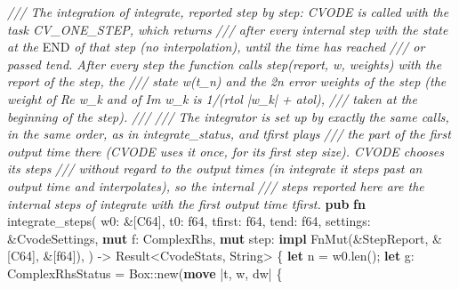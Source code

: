 \documentclass[
  10pt,
]{article}
\newenvironment{Shaded}{}{}
\newcommand{\BuiltInTok}[1]{\textcolor[rgb]{0.00,0.50,0.00}{#1}}
\newcommand{\CommentTok}[1]{\textcolor[rgb]{0.38,0.63,0.69}{\textit{#1}}}
\newcommand{\DataTypeTok}[1]{\textcolor[rgb]{0.56,0.13,0.00}{#1}}
\newcommand{\KeywordTok}[1]{\textcolor[rgb]{0.00,0.44,0.13}{\textbf{#1}}}
\newcommand{\NormalTok}[1]{#1}
\newcommand{\OperatorTok}[1]{\textcolor[rgb]{0.40,0.40,0.40}{#1}}
\newcommand{\PreprocessorTok}[1]{\textcolor[rgb]{0.74,0.48,0.00}{#1}}
\newcommand{\RegionMarkerTok}[1]{#1}
\begin{document}
\begin{Shaded}
\begin{Highlighting}[]
\CommentTok{/// The integration of \textasciigrave{}integrate\textasciigrave{}, reported step by step: CVODE is called with the task CV\_ONE\_STEP, which returns}
\CommentTok{/// after every internal step with the state at the }\RegionMarkerTok{END}\CommentTok{ of that step (no interpolation), until the time has reached}
\CommentTok{/// or passed \textasciigrave{}tend\textasciigrave{}.  After every step the function calls \textasciigrave{}step(report, w, weights)\textasciigrave{} with the report of the step, the}
\CommentTok{/// state w(t\_n) and the 2n error weights of the step (the weight of Re w\_k and of Im w\_k is 1/(rtol |w\_k| + atol),}
\CommentTok{/// taken at the beginning of the step).}
\CommentTok{///}
\CommentTok{/// The integrator is set up by exactly the same calls, in the same order, as in \textasciigrave{}integrate\_status\textasciigrave{}, and \textasciigrave{}tfirst\textasciigrave{} plays}
\CommentTok{/// the part of the first output time there (CVODE uses it once, for its first step size).  CVODE chooses its steps}
\CommentTok{/// without regard to the output times (in \textasciigrave{}integrate\textasciigrave{} it steps past an output time and interpolates), so the internal}
\CommentTok{/// steps reported here are the internal steps of \textasciigrave{}integrate\textasciigrave{} with the first output time \textasciigrave{}tfirst\textasciigrave{}.}
\KeywordTok{pub} \KeywordTok{fn}\NormalTok{ integrate\_steps(}
\NormalTok{    w0}\OperatorTok{:} \OperatorTok{\&}\NormalTok{[C64]}\OperatorTok{,}
\NormalTok{    t0}\OperatorTok{:} \DataTypeTok{f64}\OperatorTok{,}
\NormalTok{    tfirst}\OperatorTok{:} \DataTypeTok{f64}\OperatorTok{,}
\NormalTok{    tend}\OperatorTok{:} \DataTypeTok{f64}\OperatorTok{,}
\NormalTok{    settings}\OperatorTok{:} \OperatorTok{\&}\NormalTok{CvodeSettings}\OperatorTok{,}
    \KeywordTok{mut}\NormalTok{ f}\OperatorTok{:}\NormalTok{ ComplexRhs}\OperatorTok{,}
    \KeywordTok{mut}\NormalTok{ step}\OperatorTok{:} \KeywordTok{impl} \BuiltInTok{FnMut}\NormalTok{(}\OperatorTok{\&}\NormalTok{StepReport}\OperatorTok{,} \OperatorTok{\&}\NormalTok{[C64]}\OperatorTok{,} \OperatorTok{\&}\NormalTok{[}\DataTypeTok{f64}\NormalTok{])}\OperatorTok{,}
\NormalTok{) }\OperatorTok{{-}\textgreater{}} \DataTypeTok{Result}\OperatorTok{\textless{}}\NormalTok{CvodeStats}\OperatorTok{,} \DataTypeTok{String}\OperatorTok{\textgreater{}} \OperatorTok{\{}
    \KeywordTok{let}\NormalTok{ n }\OperatorTok{=}\NormalTok{ w0}\OperatorTok{.}\NormalTok{len()}\OperatorTok{;}
    \KeywordTok{let}\NormalTok{ g}\OperatorTok{:}\NormalTok{ ComplexRhsStatus }\OperatorTok{=} \DataTypeTok{Box}\PreprocessorTok{::}\NormalTok{new(}\KeywordTok{move} \OperatorTok{|}\NormalTok{t}\OperatorTok{,}\NormalTok{ w}\OperatorTok{,}\NormalTok{ dw}\OperatorTok{|} \OperatorTok{\{}

\end{Highlighting}
\end{Shaded}
\end{document}
